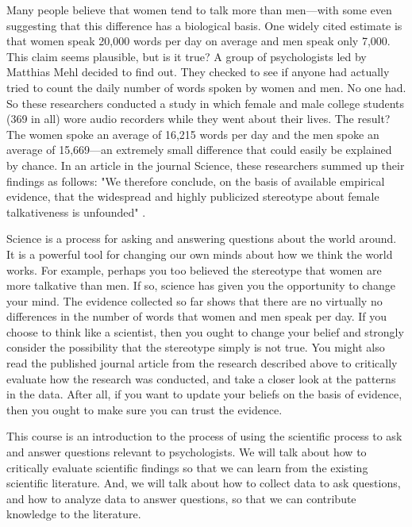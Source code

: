 



Many people believe that women tend to talk more than men---with some even suggesting that this difference has a biological basis. One widely cited estimate is that women speak 20,000 words per day on average and men speak only 7,000. This claim seems plausible, but is it true? A group of psychologists led by Matthias Mehl decided to find out. They checked to see if anyone had actually tried to count the daily number of words spoken by women and men. No one had. So these researchers conducted a study in which female and male college students (369 in all) wore audio recorders while they went about their lives. The result? The women spoke an average of 16,215 words per day and the men spoke an average of 15,669---an extremely small difference that could easily be explained by chance. In an article in the journal Science, these researchers summed up their findings as follows: "We therefore conclude, on the basis of available empirical evidence, that the widespread and highly publicized stereotype about female talkativeness is unfounded" \citep{mehl_are_2007}.

Science is a process for asking and answering questions about the world around. It is a powerful tool for changing our own minds about how we think the world works. For example, perhaps you too believed the stereotype that women are more talkative than men. If so, science has given you the opportunity to change your mind. The evidence collected so far shows that there are no virtually no differences in the number of words that women and men speak per day. If you choose to think like a scientist, then you ought to change your belief and strongly consider the possibility that the stereotype simply is not true. You might also read the published journal article from the research described above to critically evaluate how the research was conducted, and take a closer look at the patterns in the data. After all, if you want to update your beliefs on the basis of evidence, then you ought to make sure you can trust the evidence.

This course is an introduction to the process of using the scientific process to ask and answer questions relevant to psychologists. We will talk about how to critically evaluate scientific findings so that we can learn from the existing scientific literature. And, we will talk about how to collect data to ask questions, and how to analyze data to answer questions, so that we can contribute knowledge to the literature.

